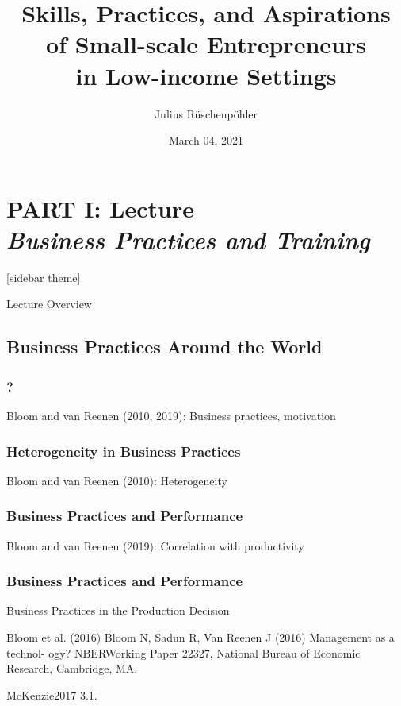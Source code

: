 \documentclass[hideothersubsections, usenames,dvipsnames,11pt]{beamer}
\title[]{Skills, Practices, and Aspirations \\ of Small-scale Entrepreneurs \\ in Low-income Settings}
\author[]{Julius R{\"u}schenp{\"o}hler\inst{}}
\institute[]{\inst{} UC Berkeley, CEGA}
\date{March 04, 2021}
\newenvironment{itemize_2pt}{\itemize\addtolength{\itemsep}{2pt}}{\enditemize}
\begin{document}
\section{\textbf{PART I: Lecture} \\ \quad \emph{Business Practices and Training}}



\begin{frame}
\titlepage
\end{frame}


[sidebar theme]

\begin{frame}{Lecture Overview}
\end{frame}


\subsection{Business Practices Around the World}

\begin{frame}
\frametitle{?}
	\begin{itemize_2pt}
	\item Bloom and van Reenen (2010, 2019): Business practices, motivation \citep{Bloom2010, Bloom2019}
	\vspace{0.1in}
	\end{itemize_2pt}
\end{frame}

\begin{frame}
\frametitle{Heterogeneity in Business Practices}
	\begin{itemize_2pt}
	\item Bloom and van Reenen (2010): Heterogeneity \citep{Bloom2010}
	\end{itemize_2pt}
\end{frame}

\begin{frame}
\frametitle{Business Practices and Performance}
	\begin{itemize_2pt}
	\item Bloom and van Reenen (2019): Correlation with productivity \citep{Bloom2019}
	\end{itemize_2pt}
\end{frame}

\begin{frame}
\frametitle{Business Practices and Performance}

Business Practices in the Production Decision
	\begin{itemize_2pt}
	\item Bloom et al. (2016) Bloom N, Sadun R, Van Reenen J (2016) Management as a technol- ogy? NBERWorking Paper 22327, National Bureau of Economic Research, Cambridge, MA.
	\item McKenzie2017 3.1.
	\end{itemize_2pt}

\end{frame}
\end{document}

